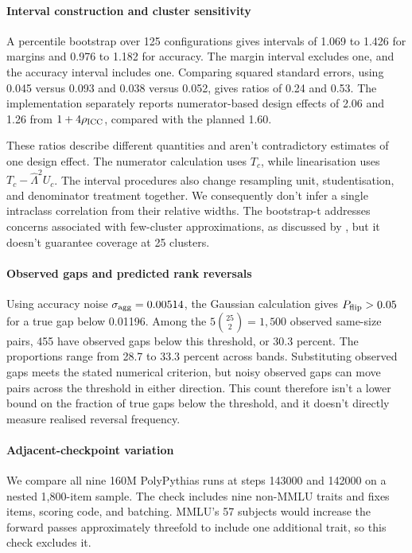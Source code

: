 \paragraph{Interval construction and cluster sensitivity}
A percentile bootstrap over 125 configurations gives intervals of 1.069 to 1.426 for margins and 0.976 to 1.182 for accuracy. The margin interval excludes one, and the accuracy interval includes one. Comparing squared standard errors, using 0.045 versus 0.093 and 0.038 versus 0.052, gives ratios of 0.24 and 0.53. The implementation separately reports numerator-based design effects of 2.06 and 1.26 from $1+4\rho_{\rm ICC}$, compared with the planned 1.60.

These ratios describe different quantities and aren't contradictory estimates of one design effect. The numerator calculation uses $T_c$, while linearisation uses $T_c-\widehat\Lambda^2U_c$. The interval procedures also change resampling unit, studentisation, and denominator treatment together. We consequently don't infer a single intraclass correlation from their relative widths. The bootstrap-t addresses concerns associated with few-cluster approximations, as discussed by \citet{bell2002}, but it doesn't guarantee coverage at 25 clusters.

\paragraph{Observed gaps and predicted rank reversals}
Using accuracy noise $\sigma_{\rm agg}=0.00514$, the Gaussian calculation gives $P_{\rm flip}>0.05$ for a true gap below 0.01196. Among the $5\binom{25}{2}=1{,}500$ observed same-size pairs, 455 have observed gaps below this threshold, or 30.3 percent. The proportions range from 28.7 to 33.3 percent across bands. Substituting observed gaps meets the stated numerical criterion, but noisy observed gaps can move pairs across the threshold in either direction. This count therefore isn't a lower bound on the fraction of true gaps below the threshold, and it doesn't directly measure realised reversal frequency.

\paragraph{Adjacent-checkpoint variation}
We compare all nine 160M PolyPythias runs at steps 143000 and 142000 on a nested 1,800-item sample. The check includes nine non-MMLU traits and fixes items, scoring code, and batching. MMLU's 57 subjects would increase the forward passes approximately threefold to include one additional trait, so this check excludes it.

